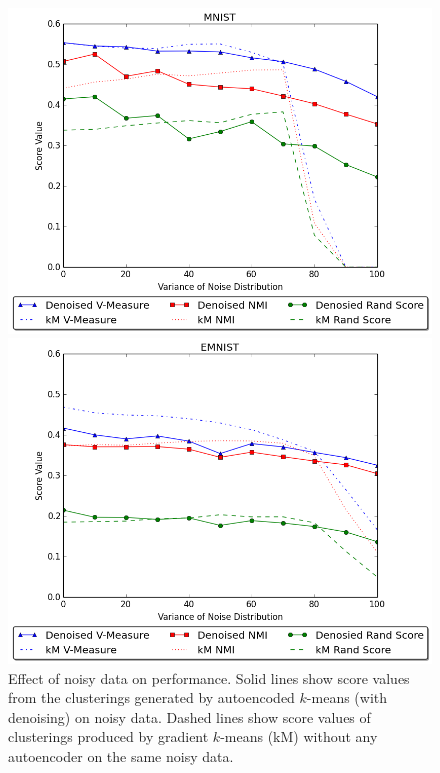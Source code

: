 \begin{figure}
	\centering
	\begin{minipage}[b]{0.45\textwidth}
		\includegraphics[width=\textwidth]{figs/mnist_noise.png}
	\end{minipage}
	\hfill
	\begin{minipage}[b]{0.45\textwidth}
		\includegraphics[width=\textwidth]{figs/emnist_noise.png}
	\end{minipage}
	\caption{Effect of noisy data on performance. Solid lines show score values from the clusterings generated by autoencoded $k$-means (with denoising) on noisy data. Dashed lines show score values of clusterings produced by gradient $k$-means (kM) without any autoencoder on the same noisy data.}
	\label{fig:noise}
\end{figure}
